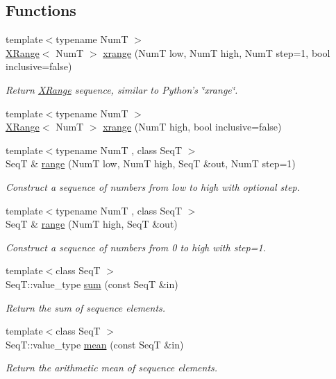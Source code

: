 \subsection*{Functions}
\begin{DoxyCompactItemize}
\item 
{\footnotesize template$<$typename Num\-T $>$ }\\\hyperlink{structseq_1_1math_1_1_x_range}{X\-Range}$<$ Num\-T $>$ \hyperlink{namespaceseq_1_1math_abfe793e999a374a4d5e6b1ef3f268b59}{xrange} (Num\-T low, Num\-T high, Num\-T step=1, bool inclusive=false)
\begin{DoxyCompactList}\small\item\em Return {\ttfamily \hyperlink{structseq_1_1math_1_1_x_range}{X\-Range}} sequence, similar to Python's \char`\"{}xrange\char`\"{}. \end{DoxyCompactList}\item 
{\footnotesize template$<$typename Num\-T $>$ }\\\hyperlink{structseq_1_1math_1_1_x_range}{X\-Range}$<$ Num\-T $>$ \hyperlink{namespaceseq_1_1math_a4f2c47e50ba86a80778ccebd31d7fa16}{xrange} (Num\-T high, bool inclusive=false)
\item 
{\footnotesize template$<$typename Num\-T , class Seq\-T $>$ }\\Seq\-T \& \hyperlink{namespaceseq_1_1math_a6bd86d848fb47f455aff84c38c175ea4}{range} (Num\-T low, Num\-T high, Seq\-T \&out, Num\-T step=1)
\begin{DoxyCompactList}\small\item\em Construct a sequence of numbers from low to high with optional step. \end{DoxyCompactList}\item 
{\footnotesize template$<$typename Num\-T , class Seq\-T $>$ }\\Seq\-T \& \hyperlink{namespaceseq_1_1math_ae9b127e8277c6c390b99c4a1195dc087}{range} (Num\-T high, Seq\-T \&out)
\begin{DoxyCompactList}\small\item\em Construct a sequence of numbers from 0 to high with step=1. \end{DoxyCompactList}\item 
{\footnotesize template$<$class Seq\-T $>$ }\\Seq\-T\-::value\-\_\-type \hyperlink{namespaceseq_1_1math_a27179daf6ca9a8d85434eda531fa134e}{sum} (const Seq\-T \&in)
\begin{DoxyCompactList}\small\item\em Return the sum of sequence elements. \end{DoxyCompactList}\item 
{\footnotesize template$<$class Seq\-T $>$ }\\Seq\-T\-::value\-\_\-type \hyperlink{namespaceseq_1_1math_ab019165412bf99555adfeaaaa86f319f}{mean} (const Seq\-T \&in)
\begin{DoxyCompactList}\small\item\em Return the arithmetic mean of sequence elements. \end{DoxyCompactList}\end{DoxyCompactItemize}


